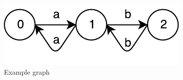 \begin{figure}[h]
\includegraphics{graph}
\caption{Example graph}
\label{fig:graph}
\end{figure}









